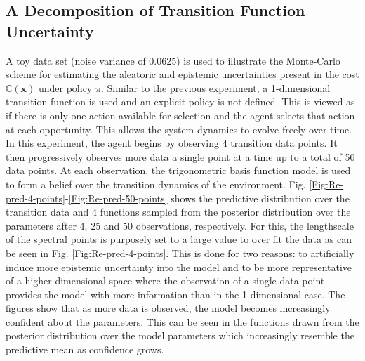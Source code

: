 \subsection{A Decomposition of Transition Function Uncertainty}
A toy data set (noise variance of 0.0625) is used to illustrate the Monte-Carlo scheme for estimating the aleatoric and epistemic uncertainties present in the cost $\mathbb{C}(\mathbf{x})$ under policy $\pi$. Similar to the previous experiment, a 1-dimensional transition function is used and an explicit policy is not defined. This is viewed as if there is only one action available for selection and the agent selects that action at each opportunity. This allows the system dynamics to evolve freely over time. In this experiment, the agent begins by observing 4 transition data points. It then progressively observes more data a single point at a time up to a total of 50 data points. At each observation, the trigonometric basis function model is used to form a belief over the transition dynamics of the environment. Fig. \ref{Fig:Re-pred-4-points}-\ref{Fig:Re-pred-50-points} shows the predictive distribution over the transition data and 4 functions sampled from the posterior distribution over the parameters after 4, 25 and 50 observations, respectively. For this, the lengthscale of the spectral points is purposely set to a large value to over fit the data as can be seen in Fig. \ref{Fig:Re-pred-4-points}. This is done for two reasons: to artificially induce more epistemic uncertainty into the model and to be more representative of a higher dimensional space where the observation of a single data point provides the model with more information than in the 1-dimensional case. The figures show that as more data is observed, the model becomes increasingly confident about the parameters. This can be seen in the functions drawn from the posterior distribution over the model parameters which increasingly resemble the predictive mean as confidence grows. 

